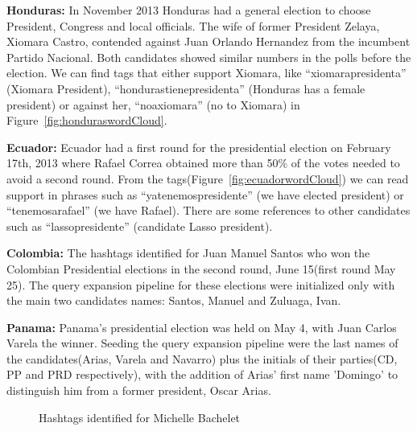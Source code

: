 \noindent
{\bf Honduras:}
In November 2013 Honduras had a general election to choose President, Congress and local officials. 
The wife of former President Zelaya, Xiomara Castro, contended against Juan Orlando Hernandez from the incumbent Partido Nacional. 
Both candidates showed similar numbers in the polls before the election. 
We can find tags that either support Xiomara, like “xiomarapresidenta” (Xiomara President), “hondurastienepresidenta” (Honduras has a female president) or against her, “noaxiomara” (no to Xiomara) in Figure~\ref{fig:honduraswordCloud}.

\noindent
{\bf Ecuador:}
Ecuador had a first round for the presidential election on February 17th, 2013 where Rafael Correa obtained more than 50\% of the votes needed to avoid a second round. 
From the tags(Figure~\ref{fig:ecuadorwordCloud}) we can read support in phrases such as “yatenemospresidente” (we have elected president) or “tenemosarafael” (we have Rafael). 
There are some references to other candidates such as “lassopresidente” (candidate Lasso president).

\noindent
{\bf Colombia:}
The hashtags identified for Juan Manuel Santos who won the Colombian Presidential elections in the second round,
June 15(first round May 25). The query expansion pipeline for these elections were initialized only with the main two candidates names: Santos, Manuel and Zuluaga, Ivan.

\noindent
{\bf Panama:}
Panama's presidential election was held on May 4, with Juan Carlos Varela the winner. Seeding the query expansion pipeline were the last names of the candidates(Arias, Varela and Navarro) plus the initials of their parties(CD, PP and PRD respectively), with the addition of Arias' first name 'Domingo' to distinguish him from a former president, Oscar Arias.

\begin{figure}
	\centering
	\caption{Hashtags identified for Michelle Bachelet} 
	\label{fig:bacheletwordCloud}
\end{figure}

